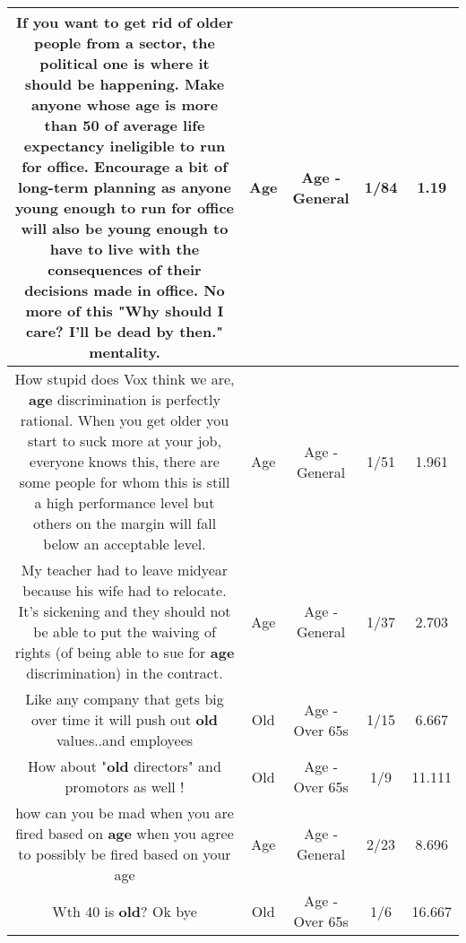\documentclass[11pt]{article}
\newlength\mylength
\begin{document}
\begin{center}
\begin{longtable}{|C{.65\mylength}|C{.30\mylength}|C{.12\mylength}|C{.12\mylength}|C{.12\mylength}|}
  \small If you want to get rid of older people from a sector, the political one is where it should be happening. Make anyone whose \textbf{age} is more than 50 of average life expectancy ineligible to run for office. Encourage a bit of long-term planning as anyone young enough to run for office will also be young enough to have to live with the consequences of their decisions made in office. No more of this "Why should I care? I'll be dead by then." mentality.\normalsize   & Age & Age - General & 1/84 & 1.19 \\  \hline
  \small How stupid does Vox think we are, \textbf{age} discrimination is perfectly rational. When you get older you start to suck more at your job, everyone knows this, there are some people for whom this is still a high performance level but others on the margin will fall below an acceptable level.\normalsize   & Age & Age - General & 1/51 & 1.961 \\  \hline
  \small My teacher had to leave midyear because his wife had to relocate. It's sickening and they should not be able to put the waiving of rights (of being able to sue for \textbf{age} discrimination) in the contract.\normalsize   & Age & Age - General & 1/37 & 2.703 \\  \hline
  \small Like any company that gets big over time it will push out \textbf{old} values..and employees\normalsize   & Old & Age - Over 65s & 1/15 & 6.667 \\  \hline
  \small How about "\textbf{old} directors" and promotors as well !\normalsize   & Old & Age - Over 65s & 1/9 & 11.111 \\  \hline
  \small how can you be mad when you are fired based on \textbf{age} when you agree to possibly be fired based on your age\normalsize   & Age & Age - General & 2/23 & 8.696 \\  \hline
  \small Wth 40 is \textbf{old}? Ok bye\normalsize   & Old & Age - Over 65s & 1/6 & 16.667 \\  \hline

\end{longtable}
\end{center}
\end{document}
